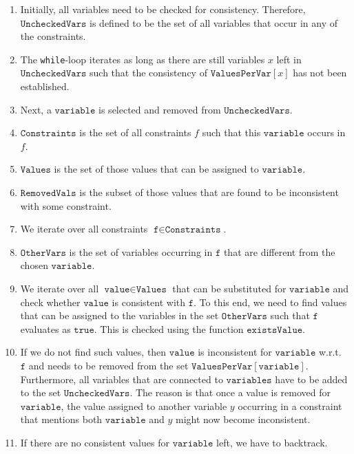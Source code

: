 \begin{enumerate}
\item Initially, all variables need to be checked for consistency.  Therefore, $\texttt{UncheckedVars}$
      is defined to be the set of all variables that occur in any of the constraints.
\item The \texttt{while}-loop iterates as long as there are still variables $x$ left in $\texttt{UncheckedVars}$
      such that the consistency of $\texttt{ValuesPerVar}[x]$ has not been established.
\item Next, a $\texttt{variable}$ is selected and removed from $\texttt{UncheckedVars}$. 
\item $\texttt{Constraints}$ is the set of all constraints $f$ such that this $\texttt{variable}$ occurs in $f$.
\item $\texttt{Values}$ is the set of those values that can be assigned to $\texttt{variable}$.
\item $\texttt{RemovedVals}$ is the subset of those values that are found to be inconsistent with some constraint.
\item We iterate over all constraints $\texttt{f} \in \texttt{Constraints}$.
\item $\texttt{OtherVars}$ is the set of variables occurring in $\texttt{f}$ that are different from 
      the chosen $\texttt{variable}$.
\item We iterate over all $\texttt{value} \in \texttt{Values}$ that can be substituted for $\texttt{variable}$
      and check whether $\texttt{value}$ is consistent with $\texttt{f}$.   To this end, we need to find values
      that can be assigned to the variables in the set $\texttt{OtherVars}$ such that $\texttt{f}$ evaluates as
      $\texttt{true}$.  This is checked using the function $\texttt{existsValue}$.
\item If we do not find such values, then $\texttt{value}$ is inconsistent for
      $\texttt{variable}$ w.r.t.~$\texttt{f}$ and needs to be removed from the set 
      $\texttt{ValuesPerVar}[\texttt{variable}]$.  Furthermore, all variables that are connected to
      $\texttt{variables}$ have to be added to the set $\texttt{UncheckedVars}$.  The reason is that once a
      value is removed for $\texttt{variable}$, the value assigned to another variable $y$ occurring in a
      constraint that mentions both $\texttt{variable}$ and $y$ might now become inconsistent.
\item If there are no consistent values for $\texttt{variable}$ left, we have to backtrack.
\end{enumerate}

